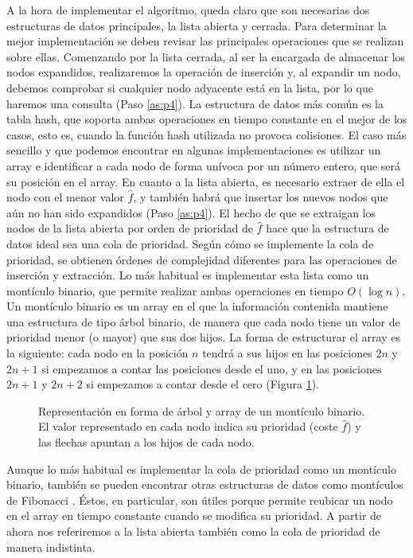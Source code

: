 \documentclass[a4paper,12pt]{article}
\begin{document}
\noindent A la hora de implementar el algoritmo, queda claro que son necesarias dos estructuras de datos principales, la lista abierta y cerrada. Para determinar la mejor implementación se deben revisar las principales operaciones que se realizan sobre ellas. Comenzando por la lista cerrada, al ser la encargada de almacenar los nodos expandidos, realizaremos la operación de inserción y, al expandir un nodo, debemos comprobar si cualquier nodo adyacente está en la lista, por lo que haremos una consulta (Paso \ref{as:p4}). La estructura de datos más común es la tabla hash, que soporta ambas operaciones en tiempo constante en el mejor de los casos, esto es, cuando la función hash utilizada no provoca colisiones. El caso más sencillo y que podemos encontrar en algunas implementaciones es utilizar un array e identificar a cada nodo de forma unívoca por un número entero, que será su posición en el array. En cuanto a la lista abierta, es necesario extraer de ella el nodo con el menor valor $\hat{f}$, y también habrá que insertar los nuevos nodos que aún no han sido expandidos (Paso \ref{as:p4}). El hecho de que se extraigan los nodos de la lista abierta por orden de prioridad de $\hat{f}$ hace que la estructura de datos ideal sea una cola de prioridad. Según cómo se implemente la cola de prioridad, se obtienen órdenes de complejidad diferentes para las operaciones de inserción y extracción. Lo más habitual es implementar esta lista como un montículo binario, que permite realizar ambas operaciones en tiempo $O(\log n)$. Un montículo binario es un array en el que la información contenida mantiene una estructura de tipo árbol binario, de manera que cada nodo tiene un valor de prioridad menor (o mayor) que sus dos hijos. La forma de estructurar el array es la siguiente: cada nodo en la posición $n$ tendrá a sus hijos en las posiciones $2n$ y $2n+1$ si empezamos a contar las posiciones desde el uno, y en las posiciones $2n + 1$ y $2n + 2$ si empezamos a contar desde el cero (Figura \ref{fig:binheap}).

\begin{figure}[H]
    \centering
    
    \caption{Representación en forma de árbol y array de un montículo binario. El valor representado en cada nodo indica su prioridad (coste $\hat{f}$) y las flechas apuntan a los hijos de cada nodo.}
    \label{fig:binheap}
\end{figure}

\noindent Aunque lo más habitual es implementar la cola de prioridad como un montículo binario, también se pueden encontrar otras estructuras de datos como montículos de Fibonacci \cite{fredman1987fibonacci}. Éstos, en particular, son útiles porque permite reubicar un nodo en el array en tiempo constante cuando se modifica su prioridad. A partir de ahora nos referiremos a la lista abierta también como la cola de prioridad de manera indistinta.
\end{document}
